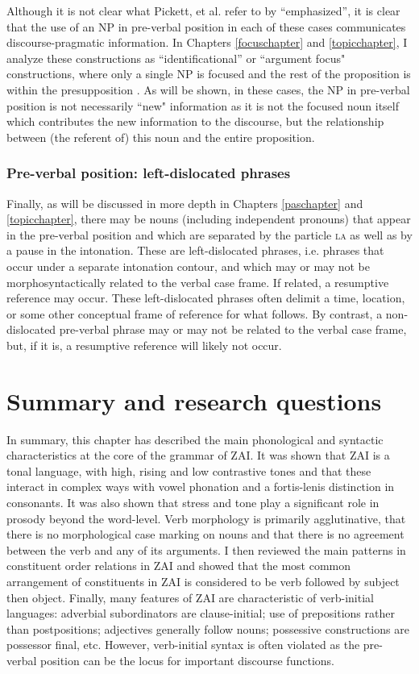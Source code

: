 Although it is not clear what Pickett, et al. refer to by ``emphasized'', it is clear that the use of an NP in pre-verbal position in each of these cases communicates discourse-pragmatic information. In Chapters \ref{focuschapter} and \ref{topicchapter}, I analyze these constructions as ``identificational'' or ``argument focus" constructions, where only a single NP is focused and the rest of the proposition is within the presupposition \citep[228-233]{lambrecht1994}. As will be shown, in these cases, the NP in pre-verbal position is not necessarily ``new" information as it is not the focused noun itself which contributes the new information to the discourse, but the relationship between (the referent of) this noun and the entire proposition.  


\subsubsection{Pre-verbal position: left-dislocated phrases}
Finally, as will be discussed in more depth in Chapters \ref{paschapter} and \ref{topicchapter}, there may be nouns (including independent pronouns) that appear in the pre-verbal position and which are separated by the particle \textsc{la} as well as by a pause in the intonation. These are left-dislocated phrases, i.e. phrases that occur under a separate intonation contour, and which may or may not be morphosyntactically related to the verbal case frame. If related, a resumptive reference may occur. These left-dislocated phrases often delimit a time, location, or some other conceptual frame of reference for what follows. By contrast, a non-dislocated pre-verbal phrase may or may not be related to the verbal case frame, but, if it is, a resumptive reference will likely not occur. 


\section{Summary and research questions}

In summary, this chapter has described the main phonological and syntactic characteristics at the core of the grammar of ZAI. It was shown that ZAI is a tonal language, with high, rising and low contrastive tones and that these interact in complex ways with vowel phonation and a fortis-lenis distinction in consonants. It was also shown that stress and tone play a significant role in prosody beyond the word-level. Verb morphology is primarily agglutinative, that there is no morphological case marking on nouns and that there is no agreement between the verb and any of its arguments. I then reviewed the main patterns in constituent order relations in ZAI and showed that the most common arrangement of constituents in ZAI is considered to be verb followed by subject then object. Finally, many features of ZAI are characteristic of verb-initial languages: adverbial subordinators are clause-initial; use of prepositions rather than postpositions; adjectives generally follow nouns; possessive constructions are possessor final, etc. However, verb-initial syntax is often violated as the pre-verbal position can be the locus for important discourse functions.


